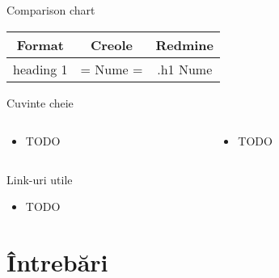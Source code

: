 \documentclass{beamer}
\begin{document}
\frame{\tableofcontents[currentsection]}

\begin{frame}{Comparison chart}
  \begin{center}
    \begin{tabular}{|c|c|c|}
      \hline
      \textbf{Format} & \textbf{Creole} & \textbf{Redmine} \\
      \hline
      \hline
      heading 1 & = Nume = & .h1 Nume \\
      \hline
    \end{tabular}
  \end{center}
\end{frame}

\begin{frame}{Cuvinte cheie}
  \begin{columns}
    \begin{column}[l]{0.5\textwidth}
      \begin{itemize}
        \item TODO
      \end{itemize}
    \end{column}
    \begin{column}[l]{0.5\textwidth}
      \begin{itemize}
        \item TODO
      \end{itemize}
    \end{column}
  \end{columns}
\end{frame}

\begin{frame}{Link-uri utile}
  \begin{itemize}
    \item TODO
  \end{itemize}
\end{frame}


\section{\^{I}ntrebări}

\frame{\tableofcontents[currentsection]}
\end{document}
